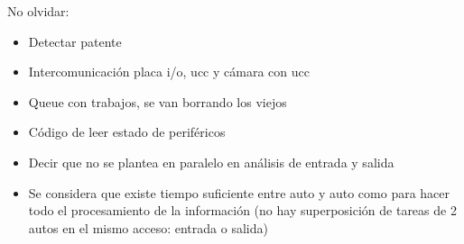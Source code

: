 No olvidar:
\begin{itemize}
	\item Detectar patente
	\item Intercomunicación placa i/o, ucc y cámara con ucc
	\item Queue con trabajos, se van borrando los viejos
	\item Código de leer estado de periféricos
	\item Decir que no se plantea en paralelo en análisis de entrada y salida
	\item Se considera que existe tiempo suficiente entre auto y auto como para hacer todo el procesamiento de la información (no hay superposición de tareas de 2 autos en el mismo acceso: entrada o salida)
\end{itemize}










